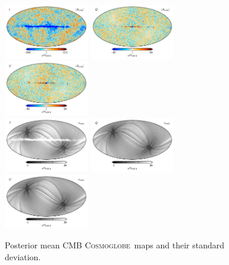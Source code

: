 \documentclass[twocolumn]{../../common/aa}
\newcommand{\cosmoglobe}{\textsc{Cosmoglobe}}
\begin{document}
\begin{figure}
	\includegraphics[width=0.33\textwidth]{figures/cmb_I_nodipole.pdf}
	\includegraphics[width=0.33\textwidth]{figures/cmb_Q.pdf}
	\includegraphics[width=0.33\textwidth]{figures/cmb_U.pdf}\\
	\includegraphics[width=0.33\textwidth]{figures/cmb_I_sigma.pdf}
	\includegraphics[width=0.33\textwidth]{figures/cmb_Q_sigma.pdf}
	\includegraphics[width=0.33\textwidth]{figures/cmb_U_sigma.pdf}\\
	\caption{Posterior mean CMB \cosmoglobe\ maps and their standard deviation.}
\end{figure}
\end{document}
